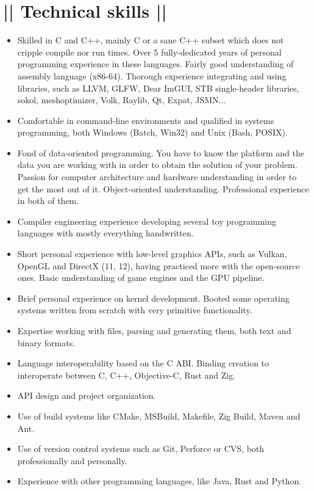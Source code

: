 \section*{|| Technical skills ||}
\begin{itemize}
	\item Skilled in C and C++, mainly C or a sane C++ subset which does not cripple compile nor run times. Over 5 fully-dedicated years of personal programming experience in these languages. Fairly good understanding of assembly language (x86-64). Thorough experience integrating and using libraries, such as LLVM, GLFW, Dear ImGUI, STB single-header libraries, sokol, meshoptimizer, Volk, Raylib, Qt, Expat, JSMN...
	
	\item Comfortable in command-line environments and qualified in systems programming, both Windows (Batch, Win32) and Unix (Bash, POSIX).
	
	\item Fond of data-oriented programming. You have to know the platform and the data you are working with in order to obtain the solution of your problem. Passion for computer architecture and hardware understanding in order to get the most out of it. Object-oriented understanding. Professional experience in both of them.
	
	\item Compiler engineering experience developing several toy programming languages with mostly everything handwritten.
	
	\item Short personal experience with low-level graphics APIs, such as Vulkan, OpenGL and DirectX (11, 12), having practiced more with the open-source ones. Basic understanding of game engines and the GPU pipeline.
	
	\item Brief personal experience on kernel development. Booted some operating systems written from scratch with very primitive functionality.
	
	\item Expertise working with files, parsing and generating them, both text and binary formats.
	
	\item Language interoperability based on the C ABI. Binding creation to interoperate between C, C++, Objective-C, Rust and Zig.
	
	\item API design and project organization.
	
	\item Use of build systems like CMake, MSBuild, Makefile, Zig Build, Maven and Ant.
	
	\item Use of version control systems such as Git, Perforce or CVS, both professionally and personally.

	\item Experience with other programming languages, like Java, Rust and Python.
\end{itemize}